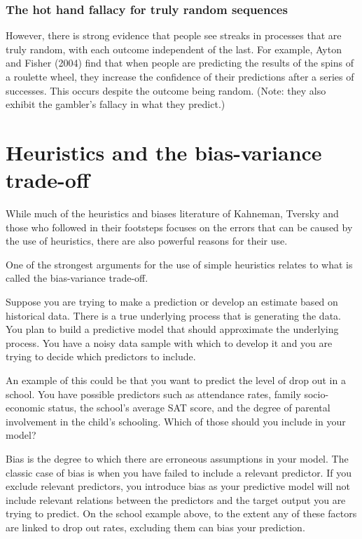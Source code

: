 \documentclass[
  letterpaper,
  DIV=11,
  numbers=noendperiod]{scrreprt}
\begin{document}
\hypertarget{the-hot-hand-fallacy-for-truly-random-sequences}{%
\subsection{The hot hand fallacy for truly random
sequences}\label{the-hot-hand-fallacy-for-truly-random-sequences}}

However, there is strong evidence that people see streaks in processes
that are truly random, with each outcome independent of the last. For
example, Ayton and Fisher (2004) find that when people are predicting
the results of the spins of a roulette wheel, they increase the
confidence of their predictions after a series of successes. This occurs
despite the outcome being random. (Note: they also exhibit the gambler's
fallacy in what they predict.)

\hypertarget{heuristics-and-the-bias-variance-trade-off}{%
\chapter{Heuristics and the bias-variance
trade-off}\label{heuristics-and-the-bias-variance-trade-off}}

While much of the heuristics and biases literature of Kahneman, Tversky
and those who followed in their footsteps focuses on the errors that can
be caused by the use of heuristics, there are also powerful reasons for
their use.

One of the strongest arguments for the use of simple heuristics relates
to what is called the bias-variance trade-off.

Suppose you are trying to make a prediction or develop an estimate based
on historical data. There is a true underlying process that is
generating the data. You plan to build a predictive model that should
approximate the underlying process. You have a noisy data sample with
which to develop it and you are trying to decide which predictors to
include.

An example of this could be that you want to predict the level of drop
out in a school. You have possible predictors such as attendance rates,
family socio-economic status, the school's average SAT score, and the
degree of parental involvement in the child's schooling. Which of those
should you include in your model?

Bias is the degree to which there are erroneous assumptions in your
model. The classic case of bias is when you have failed to include a
relevant predictor. If you exclude relevant predictors, you introduce
bias as your predictive model will not include relevant relations
between the predictors and the target output you are trying to predict.
On the school example above, to the extent any of these factors are
linked to drop out rates, excluding them can bias your prediction.
\end{document}
